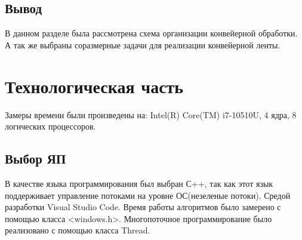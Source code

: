 \documentclass[12pt]{report}
\begin{document}
\section{Вывод}
В данном разделе была рассмотрена схема организации конвейерной обработки. А так же выбраны соразмерные задачи для реализации конвейерной ленты.


\chapter{Технологическая часть}
Замеры времени были произведены на: Intel(R) Core(TM) i7-10510U, 4 ядра, 8 логических процессоров.

\section{Выбор ЯП}
В качестве языка программирования был выбран С++, так как этот
язык поддерживает управление потоками на уровне ОС(незеленые потоки). Средой разработки Visual Studio Code. 
Время работы алгоритмов было замерено с помощью класса <windows.h>. Многопоточное программирование было
реализовано с помощью класса Thread.

\newpage
\end{document}
